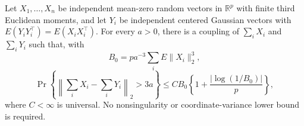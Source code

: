 Let \(X_1,\ldots,X_n\) be independent mean-zero random vectors in \(\mathbb R^p\) with finite third Euclidean moments, and let \(Y_i\) be independent centered Gaussian vectors with \(E(Y_iY_i^\top)=E(X_iX_i^\top)\). For every \(a>0\), there is a coupling of \(\sum_iX_i\) and \(\sum_iY_i\) such that, with
\[
 B_0=pa^{-3}\sum_iE\|X_i\|_2^3,
\]
\[
 \Pr\left\{\left\|\sum_iX_i-\sum_iY_i\right\|_2>3a\right\}
 \le C B_0\left\{1+\frac{|\log(1/B_0)|}{p}\right\},
\]
where \(C<\infty\) is universal. No nonsingularity or coordinate-variance lower bound is required.